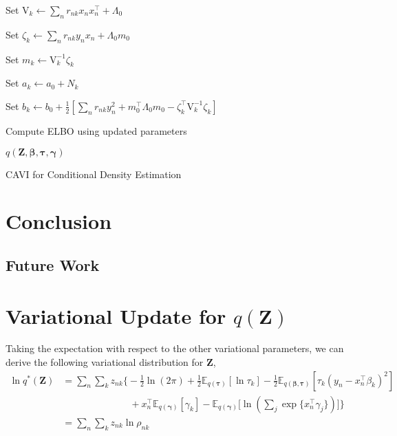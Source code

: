 \documentclass[twoside,11pt]{article}
\newcommand{\tr}{\intercal}
\newcommand{\transpose}[1]{#1^{\intercal}}
\newcommand{\nsum}{\sum_{n}}
\newcommand{\boldbeta}{\boldsymbol\beta}
\newcommand{\boldgamma}{\boldsymbol\gamma}
\newcommand{\boldtau}{\boldsymbol\tau}
\newcommand{\E}{\mathbb{E}}
\begin{document}
\begin{algorithm}[H]
{{   Set $\mathrm{V}_k \leftarrow \nsum r_{nk} x_n \transpose{x_n} + \Lambda_0$ \; %
   
   Set $\zeta_k \leftarrow \sum_{n} r_{nk} y_n x_n + \Lambda_0 m_0$\; %
   
   Set $m_k \leftarrow \mathrm{V}_k^{-1} \zeta_k$\; %
   
   Set $a_k \leftarrow a_0 + N_k$\; %
   
   Set $b_k \leftarrow b_0 + \frac{1}{2}[\nsum r_{nk} y_n^2 + \transpose{m_0}\Lambda_0 m_0 - \transpose{\zeta_k} \mathrm{V}_k^{-1} \zeta_k]$\; %
   }
   Compute ELBO using updated parameters
 } %
 \Return $q \left( \mathbf{Z}, \boldbeta, \boldtau, \boldgamma \right)$
 \caption{CAVI for Conditional Density Estimation}
\end{algorithm}



\section{Conclusion}




\subsection{Future Work}



\newpage

\appendix
\section{Variational Update for $q(\mathbf{Z})$} 
\label{app:q_z}

Taking the expectation with respect to the other variational parameters, we can derive the following variational distribution for $\mathbf{Z}$,
\begin{align*}
	\ln q^{*}(\mathbf{Z}) &= \sum_n \sum_k z_{nk} \Bigg\{  -\frac{1}{2}\ln(2\pi) + \frac{1}{2} \E_{q(\boldsymbol\tau)}[ \ln \tau_k ] - \frac{1}{2} \E_{q(\boldsymbol\beta, \boldsymbol\tau)}[\tau_k (y_n - x_n^{\tr}\beta_k)^2] \\ 
	&\qquad \qquad \qquad \quad + x_n^{\tr}\E_{q(\boldsymbol\gamma)}[\gamma_k] - \E_{q(\boldsymbol\gamma)}\Bigg[\ln ( \sum_{j} \exp \{ x_n^{\tr} \gamma_j \})\Bigg]\Bigg\} \\
	&= \sum_n \sum_k z_{nk} \ln \rho_{nk}
\end{align*}
\end{document}
